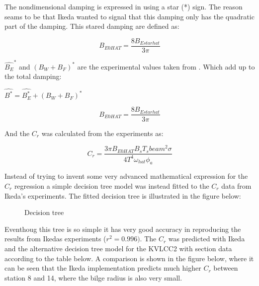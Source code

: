     

    The nondimensional damping is expressed in \cite{7505983/4AFVVGNT} using
a star (*) sign. The reason seams to be that Ikeda wanted to signal that
this damping only has the quadratic part of the damping. This stared
damping are defined as:
 
            
    
    \begin{equation}
B_{E0 HAT} = \frac{8 B_{E star hat}}{3 \pi}
\label{eq:equation}
\end{equation}

    

    \(\hat{B_E}^*\) and \((B_W+B_F)^*\) are the experimental values taken
from \cite{7505983/4AFVVGNT}. Which add up to the total damping:

    \(\hat{B^*} = \hat{B^*_E} + (B_W+B_F)^*\)
 
            
    
    \begin{equation}
B_{E0 HAT} = \frac{8 B_{E star hat}}{3 \pi}
\label{eq:equation}
\end{equation}

    

    And the \(C_r\) was calculated from the experiments as:
 
            
    
    \begin{equation}
C_{r} = \frac{3 \pi B_{E0 HAT} B_{s} T_{s} beam^{2} \sigma}{4 T^{4} \omega_{hat} \phi_{a}}
\label{eq:equation}
\end{equation}

    

    Instead of trying to invent some very advanced mathematical expression
for the \(C_r\) regression a simple decision tree model was instead
fitted to the \(C_r\) data from Ikeda's experiments. The fitted decision
tree is illustrated in the figure below:

    \begin{figure}
        \begin{center}\end{center}
        \caption{Decision tree}
        \label{fig:decision_tree}
    \end{figure}
    
    Eventhoug this tree is so simple it has very good accuracy in
reproducing the results from Ikedas experiments (\(r^2=0.996)\). The
\(C_r\) was predicted with Ikeda and the alternative decision tree model
for the KVLCC2 with section data according to the table below. A
comparison is shown in the figure below, where it can be seen that the
Ikeda implementation predicts much higher \(C_r\) between station 8 and
14, where the bilge radius is also very small.

